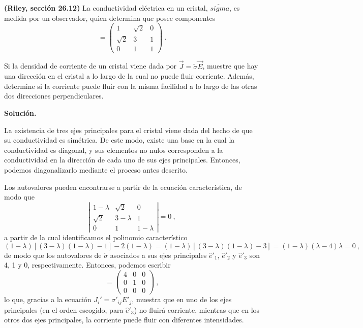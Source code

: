 \begin{ejemplo}
    \textbf{(Riley, sección 26.12)} La conductividad eléctrica en un cristal, $\check{sigma}$, es medida por un observador, quien determina que posee componentes
    \begin{equation*}
        [\sigma_{ij}] = \begin{pmatrix}
            1 & \sqrt{2} & 0 \\
            \sqrt{2} & 3 & 1 \\
            0 & 1 & 1
        \end{pmatrix} \ .
    \end{equation*}

    Si la densidad de corriente de un cristal viene dada por $\vec{J} = \check{\sigma} \vec{E}$, muestre que hay una dirección en el cristal a lo largo de la cual no puede fluir corriente. Además, determine si  la corriente puede fluir con la misma facilidad a lo largo de las otras dos direcciones perpendiculares.

    \textbf{Solución.} 

    La existencia de tres ejes principales para el cristal viene dada del hecho de que su conductividad es simétrica. De este modo, existe una base en la cual la conductividad es diagonal, y sus elementos no nulos corresponden a la conductividad en la dirección de cada uno de sus ejes principales. Entonces, podemos diagonalizarlo mediante el proceso antes descrito.

    Los autovalores pueden encontrarse a partir de la ecuación característica, de modo que 
    \begin{equation*} \left|
        \begin{array}{ccc}
            1 - \lambda & \sqrt{2} & 0 \\
            \sqrt{2} & 3 - \lambda & 1 \\
            0 & 1 & 1 - \lambda
        \end{array} \right| = 0 \ ,
    \end{equation*}
    a partir de la cual identificamos el polinomio característico
    \begin{equation*}
        (1-\lambda)[(3 - \lambda)(1-\lambda) - 1] - 2(1-\lambda) = (1-\lambda)[(3-\lambda)(1-\lambda) - 3] = (1-\lambda)(\lambda-4)\lambda = 0 \ ,
    \end{equation*}
    de modo que los autovalores de $\check{\sigma}$ asociados a sus ejes principales $\hat{e}'_1$, $\hat{e}'_2$ y $\hat{e}'_3$ son 4, 1 y 0, respectivamente. Entonces, podemos escribir
    \begin{equation*}
        [\sigma'_{ij}] = \begin{pmatrix}
            4 & 0 & 0 \\
            0 & 1 & 0 \\
            0 & 0 & 0 
        \end{pmatrix} \ ,
    \end{equation*}
    lo que, gracias a la ecuación $J_i' = \sigma'_{ij} E'_j$, muestra que en uno de los ejes principales (en el orden escogido, para $\hat{e}'_3$) no fluirá corriente, mientras que en los otros dos ejes principales, la corriente puede fluir con diferentes intensidades. 
\end{ejemplo}

